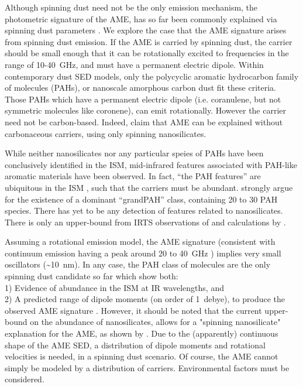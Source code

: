 \documentclass[preprint2,longabstract]{aastex}
\begin{document}
     Although spinning dust need not be the only emission mechanism, the photometric signature of the AME, has so far been commonly explained via spinning dust parameters \citep{ysard11,ali-haimoud10}. We explore the case that the AME signature arises from spinning dust emission. If the AME is carried by spinning dust, the carrier should be small enough that it can be rotationally excited to frequencies in the range of 10-40~GHz, and must have a permanent electric dipole. Within contemporary dust SED models, only the polycyclic aromatic hydrocarbon family of molecules (PAHs), or nanoscale amorphous carbon dust fit these criteria. Those PAHs which have a permanent electric dipole (i.e. coranulene, but not symmetric molecules like coronene), can emit rotationally. However the carrier need not be carbon-based. Indeed, \cite{hensley17a} claim that AME can be explained without carbonaceous carriers, using only spinning nanosilicates.

     While neither nanosilicates nor any particular speies of PAHs have been conclusively identified in the ISM, mid-infrared features associated with PAH-like aromatic materials have been observed. In fact, ``the PAH features'' are ubiquitous in the ISM \citep{giard94,onaka96,onaka00}, such that the carriers must be abundant. \cite{andrews15} strongly argue for the  existence of a dominant ``grandPAH'' class, containing 20 to 30 PAH species. There has yet to be any detection of features related to nanosilicates. There is only an upper-bound from IRTS observations of \cite{onaka96} and calculations by \cite{li01}.

     Assuming a rotational emission model, the AME signature (consistent with continuum emission having a peak around 20 to 40~GHz ) implies very small oscillators (\textasciitilde{}10~nm). In any case, the PAH class of molecules are the only spinning dust candidate so far which show both: \\
     1) Evidence of abundance in the ISM at IR wavelengths, and \\
     2) A predicted range of dipole moments (on order of 1~debye), to produce the observed AME signature \citep{draine98b, lovas05, thorwirth07}. However, it should be noted that the current upper-bound on the abundance of nanosilicates, allows for a "spinning nanosilicate" explanation for the AME, as shown by \cite{hensley17a}. Due to the (apparently) continuous shape of the AME SED, a distribution of dipole moments and rotational velocities is needed, in a spinning dust scenario. Of course, the AME cannot simply be modeled by a distribution of carriers. Environmental factors must be considered.
\end{document}
